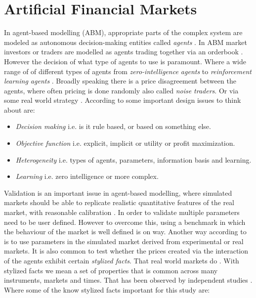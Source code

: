 \documentclass{kththesis}
\theoremstyle{definition}
\begin{document}

\newpage

\section{Artificial Financial Markets}
In agent-based modelling (ABM), appropriate parts of the complex system are modeled as autonomous decision-making entities called \textit{agents} \parencite{darley2007nasdaq}. In ABM market investors or traders are modelled as agents trading together via an orderbook \parencite{lussange2018bright}. However the decision of what type of agents to use is paramount. Where a wide range of of different types of agents from \textit{zero-intelligence agents} to \textit{reinforcement learning agents} \parencite{martinez2009evolutionary}. Broadly speaking there is a price disagreement between the agents, where often pricing is done randomly also called \textit{noise traders}. Or via some real world strategy \parencite{lussange2018bright}. According to \textcite{martinez2009evolutionary} some important design issues to think about are:

\begin{itemize}
    \item \textit{Decision making} i.e. is it rule based, or based on something else.
    \item \textit{Objective function} i.e. explicit, implicit or utility or profit maximization.
    \item \textit{Heterogeneity} i.e. types of agents, parameters, information basis and learning.
    \item \textit{Learning} i.e. zero intelligence or more complex.
\end{itemize}
Validation is an important issue in agent-based modelling, where simulated markets should be able to replicate realistic quantitative features of the real market, with reasonable calibration \parencite{martinez2009evolutionary}. In order to validate multiple parameters need to be user defined. However to overcome this, using a benchmark in which the behaviour of the market is well defined is on way. Another way according to \textcite{martinez2009evolutionary} is to use parameters in the simulated market derived from experimental or real markets. 
\newline
\newline
It is also common to test whether the prices created via the interaction of the agents exhibit certain \textit{stylized facts}. That real world markets do \parencite{brandouy2011design}. With stylized facts we mean a set of properties that is common across many instruments, markets and times. That has been observed by independent studies \parencite{cont2001empirical}. Where some of the know stylized facts important for this study are:
\end{document}
